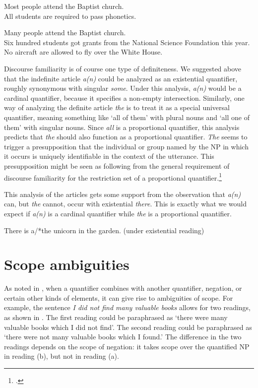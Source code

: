 \ea \label{ex:14.28}
\ea Most people attend the Baptist church.\\
\ex All students are required to pass phonetics.
                       \z
\z

\ea \label{ex:14.29}
\ea Many people attend the Baptist church.\\
\ex Six hundred students got grants from the National Science Foundation this year.\\
\ex No aircraft are allowed to fly over the White House.
                       \z
\z


Discourse familiarity is of course one type of definiteness. We suggested above that the indefinite article \textit{a(n)} could be analyzed as an existential quantifier, roughly synonymous with singular \textit{some}. Under this analysis, \textit{a(n)} would be a cardinal quantifier, because it specifies a non-empty intersection. Similarly, one way of analyzing the definite article \textit{the} is to treat it as a special universal quantifier, meaning something like ‘all of them’ with plural nouns and ‘all one of them’ with singular nouns. Since \textit{all} is a proportional quantifier, this analysis predicts that \textit{the} should also function as a proportional quantifier. \textit{The} seems to trigger a presupposition that the individual or group named by the NP in which it occurs is uniquely identifiable in the context of the utterance. This presupposition might be seen as following from the general requirement of discourse familiarity for the restriction set of a proportional quantifier.\footnote{\citet{Kearns2000}.}



This analysis of the articles gets some support from the observation that \textit{a(n)} can, but \textit{the} cannot, occur with existential \textit{there}. This is exactly what we would expect if \textit{a(n)} is a cardinal quantifier while \textit{the} is a proportional quantifier.


\ea \label{ex:14.30}
  There is a/*the unicorn in the garden.  (under existential reading)
\z

\section{Scope ambiguities}\label{sec:14.5}

As noted in , when a quantifier combines with another quantifier, negation, or certain other kinds of elements, it can give rise to ambiguities of scope. For example, the sentence \textit{I did not find many valuable books} allows for two readings, as shown in . The first reading could be paraphrased as ‘there were many valuable books which I did not find’. The second reading could be paraphrased as ‘there were not many valuable books which I found.’ The difference in the two readings depends on the scope of negation: it takes scope over the quantified NP in reading (b), but not in reading (a).


